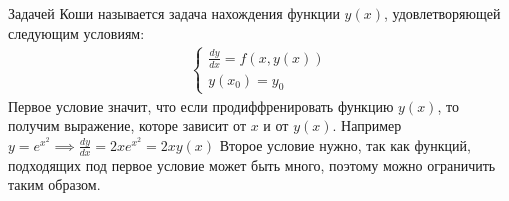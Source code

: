 
\begin{definition} \thmslashn
  
  Задачей Коши называется задача нахождения функции $y(x)$, удовлетворяющей следующим условиям:
  \[\begin{aligned}
    \begin{cases}
      \frac{dy}{dx} = f(x, y(x)) \\
      y(x_0) = y_0
    \end{cases}
  \end{aligned}\]
  Первое условие значит, что если продиффренировать функцию $y(x)$, то получим выражение, которе зависит от $x$ и от $y(x)$. Например $y = e^{x^2} \implies \frac{dy}{dx} = 2xe^{x^2} = 2xy(x)$
  Второе условие нужно, так как функций, подходящих под первое условие может быть много, поэтому можно ограничить таким образом.
\end{definition}

